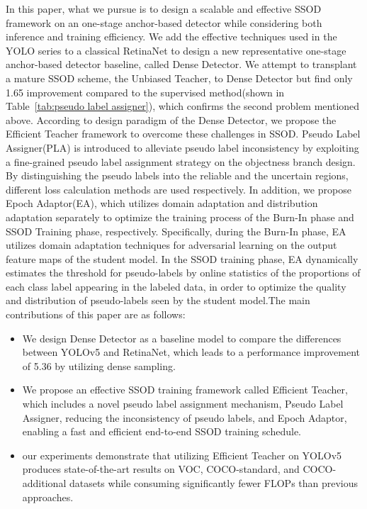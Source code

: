 \documentclass[10pt,twocolumn,letterpaper]{article}
\begin{document}
In this paper, what we pursue is to design a scalable and effective SSOD framework on an one-stage anchor-based detector while considering both inference and training efficiency. We add the effective techniques used in the YOLO series\cite{ge2021yolox, bochkovskiy2020yolov4, wang2022yolov7} to a classical RetinaNet\cite{lin2017focal} to design a new representative one-stage anchor-based detector baseline, called Dense Detector. We attempt to transplant a mature SSOD scheme, the Unbiased Teacher\cite{liu2021unbiased}, to Dense Detector but find only 1.65  improvement compared to the supervised method(shown in Table~\ref{tab:pseudo label assigner}), which confirms the second problem mentioned above. According to design paradigm of the Dense Detector, we propose the Efficient Teacher framework to overcome these challenges in SSOD. Pseudo Label Assigner(PLA) is introduced to alleviate pseudo label inconsistency by exploiting a fine-grained pseudo label assignment strategy on the objectness branch design. 
By distinguishing the pseudo labels into the reliable and the uncertain regions, different loss calculation methods are used respectively. 
In addition, we propose Epoch Adaptor(EA),  which utilizes domain adaptation and distribution adaptation separately to optimize the training process of the Burn-In phase and SSOD Training phase, respectively. 
Specifically, during the Burn-In phase, EA utilizes domain adaptation techniques for adversarial learning on the output feature maps of the student model. In the SSOD training phase, EA dynamically estimates the threshold for pseudo-labels by online statistics of the proportions of each class label appearing in the labeled data, in order to optimize the quality and distribution of pseudo-labels seen by the student model.The main contributions of this paper are as follows:
\begin{itemize}[leftmargin=12pt, topsep=2pt, itemsep=0pt]
\item We design Dense Detector as a baseline model to compare the differences between YOLOv5 and RetinaNet, which leads to a performance improvement of 5.36  by utilizing dense sampling. 

\item We propose an effective SSOD training framework called Efficient Teacher, which includes a novel pseudo label assignment mechanism, Pseudo Label Assigner, reducing the inconsistency of pseudo labels, and Epoch Adaptor, enabling a fast and efficient end-to-end SSOD training schedule. 

\item our experiments demonstrate that utilizing Efficient Teacher on YOLOv5 produces state-of-the-art results on VOC, COCO-standard, and COCO-additional datasets while consuming significantly fewer FLOPs than previous approaches.
\end{itemize}
\end{document}
